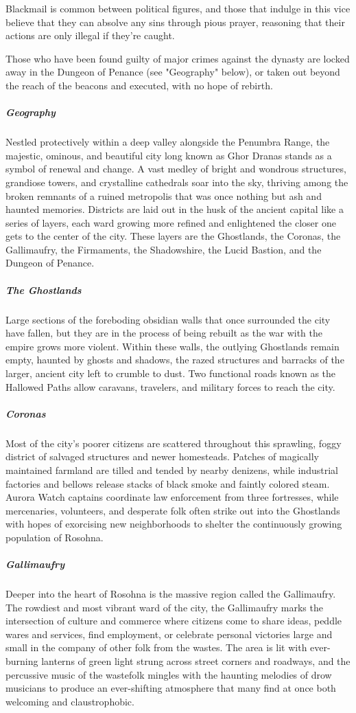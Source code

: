 \documentclass[10pt,a4paper,twoside,bg=print,twocolumn,openany,nodeprecatedcode]{dndbook}
\begin{document}
Blackmail is common between political figures, and those that indulge in this vice believe that they can absolve any sins through pious prayer, reasoning that their actions are only illegal if they're caught.

Those who have been found guilty of major crimes against the dynasty are locked away in the Dungeon of Penance (see "Geography" below), or taken out beyond the reach of the beacons and executed, with no hope of rebirth.

\subparagraph{Geography}
Nestled protectively within a deep valley alongside the Penumbra Range, the majestic, ominous, and beautiful city long known as Ghor Dranas stands as a symbol of renewal and change. A vast medley of bright and wondrous structures, grandiose towers, and crystalline cathedrals soar into the sky, thriving among the broken remnants of a ruined metropolis that was once nothing but ash and haunted memories. Districts are laid out in the husk of the ancient capital like a series of layers, each ward growing more refined and enlightened the closer one gets to the center of the city. These layers are the Ghostlands, the Coronas, the Gallimaufry, the Firmaments, the Shadowshire, the Lucid Bastion, and the Dungeon of Penance.

\subparagraph{The Ghostlands}
Large sections of the foreboding obsidian walls that once surrounded the city have fallen, but they are in the process of being rebuilt as the war with the empire grows more violent. Within these walls, the outlying Ghostlands remain empty, haunted by ghosts and shadows, the razed structures and barracks of the larger, ancient city left to crumble to dust. Two functional roads known as the Hallowed Paths allow caravans, travelers, and military forces to reach the city.

\subparagraph{Coronas}
Most of the city's poorer citizens are scattered throughout this sprawling, foggy district of salvaged structures and newer homesteads. Patches of magically maintained farmland are tilled and tended by nearby denizens, while industrial factories and bellows release stacks of black smoke and faintly colored steam. Aurora Watch captains coordinate law enforcement from three fortresses, while mercenaries, volunteers, and desperate folk often strike out into the Ghostlands with hopes of exorcising new neighborhoods to shelter the continuously growing population of Rosohna.

\subparagraph{Gallimaufry}
Deeper into the heart of Rosohna is the massive region called the Gallimaufry. The rowdiest and most vibrant ward of the city, the Gallimaufry marks the intersection of culture and commerce where citizens come to share ideas, peddle wares and services, find employment, or celebrate personal victories large and small in the company of other folk from the wastes. The area is lit with ever-burning lanterns of green light strung across street corners and roadways, and the percussive music of the wastefolk mingles with the haunting melodies of drow musicians to produce an ever-shifting atmosphere that many find at once both welcoming and claustrophobic.
\end{document}
